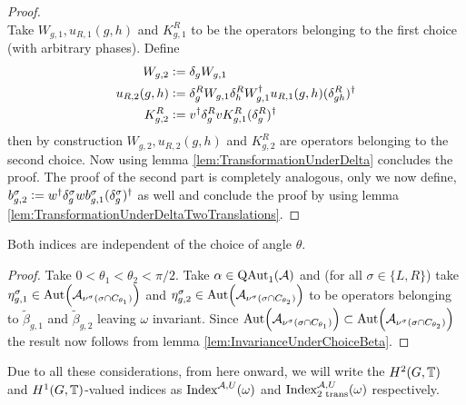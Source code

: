 \documentclass[11pt,a4paper,twoside]{article}
\numberwithin{equation}{section}
\begin{document}
\begin{proof}
\begin{equation}
		\end{equation}
		Take $W_{g,1},u_{R,1}(g,h)$ and $K^R_{g,1}$ to be the operators belonging to the first choice (with arbitrary phases). Define
		\begin{align}
			W_{g,2}&\defeq\delta_g W_{g,1}\\
			u_{R,2}(g,h)&\defeq \delta_g^R W_{g,1}\delta_h^R W_{g,1}^\dagger u_{R,1}(g,h)(\delta_{gh}^R)^\dagger\\
			K^R_{g,2}&\defeq v^\dagger \delta_g^R v K_{g,1}^R (\delta_g^R)^\dagger
		\end{align}
		then by construction $W_{g,2},u_{R,2}(g,h)$ and $K^R_{g,2}$ are operators belonging to the second choice. Now using lemma \ref{lem:TransformationUnderDelta} concludes the proof. The proof of the second part is completely analogous, only we now define, $b_{g,2}^\sigma\defeq w^\dagger\delta^\sigma_g w b_{g,1}^\sigma (\delta^\sigma_g)^\dagger$ as well and conclude the proof by using lemma \ref{lem:TransformationUnderDeltaTwoTranslations}.
	\end{proof}
	\begin{lemma}
		Both indices are independent of the choice of angle $\theta$.
	\end{lemma}
	\begin{proof}
		Take $0<\theta_1<\theta_2<\pi/2$. Take $\alpha\in \QAut{\AA}$ and (for all $\sigma\in\{L,R\}$) take $\eta_{g,1}^\sigma\in\Aut{\AA_{\nu^{\sigma}(\sigma\cap C_{\theta_1})}}$ and $\eta_{g,2}^\sigma\in\Aut{\AA_{\nu^{\sigma}(\sigma\cap C_{\theta_2})}}$ to be operators belonging to $\tilde{\beta}_{g,1}$ and $\tilde{\beta}_{g,2}$ leaving $\omega$ invariant. Since $\Aut{\AA_{\nu^{\sigma}(\sigma\cap C_{\theta_1})}}\subset \Aut{\AA_{\nu^{\sigma}(\sigma\cap C_{\theta_2})}}$ the result now follows from lemma \ref{lem:InvarianceUnderChoiceBeta}.
	\end{proof}
	Due to all these considerations, from here onward, we will write the $H^2(G,\TT)$ and $H^1(G,\TT)$-valued indices as $\textrm{Index}^{\AA,U}(\omega)$ and $\textrm{Index}^{\AA,U}_{\text{2 trans}}(\omega)$ respectively.
\end{document}
